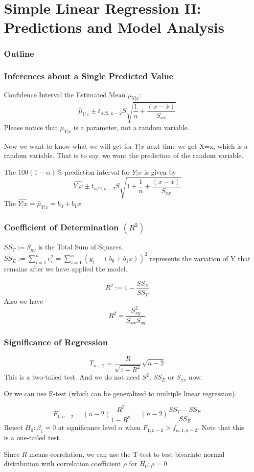 \documentclass{beamer}
\begin{document}
\section{Simple Linear Regression II:
Predictions and Model Analysis}
\begin{frame}
    \frametitle{Outline}
    \tableofcontents[currentsection]
\end{frame}
\begin{frame}
    \frametitle{Inferences about a Single Predicted Value}

    Confidence Interval the Estimated Mean $\mu_{Y|x}$: 
    \[\hat{\mu}_{Y|x}\pm t_{\alpha/2, n-2}S\sqrt{\frac{1}{n}+\frac{(x-\overline{x})}{S_{xx}}}\]
    Please notice that $\mu_{Y|x}$ is a parameter, not a random variable.\par
    Now we want to know what we will get for $Y|x$ next time we get X=x, which is a random variable. That is to say, we want the prediction of the random variable.\par
    The $100(1-\alpha)\%$ prediction interval for $Y|x$ is given by
    \[\widehat{Y|x}\pm t_{\alpha/2, n-2}S\sqrt{1+\frac{1}{n}+\frac{(x-\overline{x})}{S_{xx}}}\]
    The $\widehat{Y|x}=\hat{\mu}_{Y|x}=b_0+b_1 x$

\end{frame}

\begin{frame}
    \frametitle{Coefficient of Determination $(R^2)$}

    $SS_{T}:=S_{yy}$ is the Total Sum of Squares. $SS_{E}:=\sum\limits_{i=1}^{n} e_i^2=\sum\limits_{i=1}^{n} (y_i-(b_0+b_1 x))^2$ represents the variation of Y that remains after we have applied the
    model.\par
    \[R^2:=1-\frac{SS_{E}}{SS_{T}}\]
    Also we have 
    \[R^2=\frac{S_{xy}^2}{S_{xx}S_{yy}}\]

\end{frame}

\begin{frame}
    \frametitle{Significance of Regression}

    \[T_{n-2}=\frac{R}{\sqrt{1-R^2}}\sqrt{n-2}\]
    This is a two-tailed test. And we do not need $S^2$, $SS_{E}$ or $S_{xx}$ now.\par
    Or we can use F-test (which can be generalized to multiple linear regression).\par
    \[F_{1,n-2}=(n-2)\frac{R^2}{1-R^2}=(n-2)\frac{SS_{T}-SS_{E}}{SS_{E}}\]
    Reject $H_0: \beta_1=0$ at significance level $\alpha$ when $F_{1,n-2}>f_{\alpha,1, n-2}$. Note that this is a one-tailed test.\par
    Since $R$ means correlation, we can use the T-test to test bivariate normal distribution with correlation coefficient $\rho$ for $H_0: \rho=0$
\end{frame}
\end{document}
